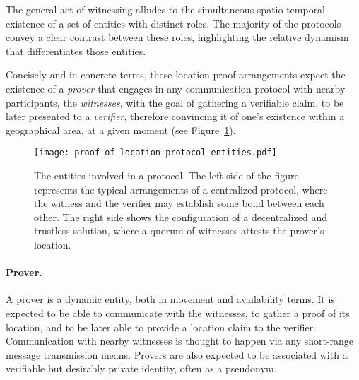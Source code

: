 The general act of witnessing alludes to the simultaneous spatio-temporal existence of a set of entities with distinct roles. The majority of the protocols convey a clear contrast between these roles, highlighting the relative dynamism that differentiates those entities. 


Concisely and in concrete terms, these location-proof arrangements expect the existence of a \emph{prover} that engages in any communication protocol with nearby participants, the \emph{witnesses}, with the goal of gathering a verifiable \pol{} claim, to be later presented to a \emph{verifier}, therefore convincing it of one's existence within a geographical area, at a given moment \cite{dupin2018location} (see Figure~\ref{fig:proof-of-location-protocol-entities}).

\begin{figure}[h!]
    \begin{center}
    \texttt{[image: proof-of-location-protocol-entities.pdf]}
    \caption{The entities involved in a \pol{} protocol. The left side of the figure represents the typical arrangements of a centralized protocol, where the witness and the verifier may establish some bond between each other. The right side shows the configuration of a decentralized and trustless solution, where a quorum of witnesses attests the prover's location.}
    \label{fig:proof-of-location-protocol-entities}
    \end{center}
\end{figure}

\paragraph{Prover.} A prover is a dynamic entity, both in movement and availability terms. It is expected to be able to communicate with the witnesses, to gather a proof of its location, and to be later able to provide a location claim to the verifier. Communication with nearby witnesses is thought to happen via any short-range message transmission means. Provers are also expected to be associated with a verifiable but desirably private identity, often as a pseudonym.


